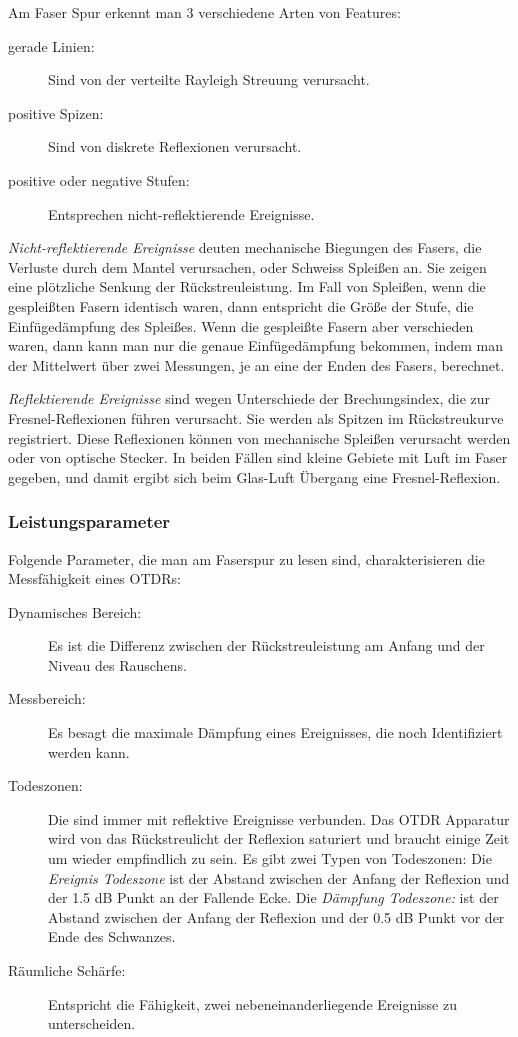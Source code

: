 \documentclass[a4paper]{article}
\begin{document}
Am Faser Spur erkennt man 3 verschiedene Arten von Features:
\begin{description}
  \item[gerade Linien:] Sind von der verteilte Rayleigh Streuung verursacht.
  \item[positive Spizen:] Sind von diskrete Reflexionen verursacht.
  \item[positive oder negative Stufen:] Entsprechen nicht-reflektierende
    Ereignisse. 
\end{description}

\emph{Nicht-reflektierende Ereignisse} deuten mechanische Biegungen des Fasers,
die Verluste durch dem Mantel verursachen, oder Schweiss Spleißen an. Sie
zeigen eine plötzliche Senkung der Rückstreuleistung. Im Fall von Spleißen,
wenn die gespleißten Fasern identisch waren, dann entspricht die Größe der
Stufe, die Einfügedämpfung des Spleißes. Wenn die gespleißte Fasern aber
verschieden waren, dann kann man nur die genaue Einfügedämpfung bekommen, indem
man der Mittelwert über zwei Messungen, je an eine der Enden des Fasers,
berechnet. 

\emph{Reflektierende Ereignisse} sind wegen Unterschiede der Brechungsindex,
die zur Fresnel-Reflexionen führen verursacht. Sie werden als Spitzen im
Rückstreukurve registriert. Diese Reflexionen können von mechanische Spleißen
verursacht werden oder von optische Stecker. In beiden Fällen sind kleine
Gebiete mit Luft im Faser gegeben, und damit ergibt sich beim Glas-Luft
Übergang eine Fresnel-Reflexion.

\subsubsection{Leistungsparameter}

Folgende Parameter, die man am Faserspur zu lesen sind, charakterisieren die
Messfähigkeit eines OTDRs:

\begin{description}
  \item[Dynamisches Bereich:] Es ist die Differenz zwischen der 
    Rückstreuleistung am Anfang und der Niveau des Rauschens.
 
  \item[Messbereich:] Es besagt die maximale Dämpfung eines Ereignisses, die
    noch Identifiziert werden kann.
  
  \item[Todeszonen:] Die sind immer mit reflektive Ereignisse verbunden. Das
    OTDR Apparatur wird von das Rückstreulicht der Reflexion saturiert und
    braucht einige Zeit um wieder empfindlich zu sein. Es gibt zwei Typen von
    Todeszonen: Die \emph{Ereignis Todeszone} ist der Abstand zwischen der
    Anfang der Reflexion und der 1.5 dB Punkt an der Fallende Ecke. Die
    \emph{Dämpfung Todeszone:} ist der Abstand zwischen der Anfang der
    Reflexion und der 0.5 dB Punkt vor der Ende des Schwanzes.
  
      \item[Räumliche Schärfe:] Entspricht die Fähigkeit, zwei
    nebeneinanderliegende Ereignisse zu unterscheiden.
\end{description}
\end{document}
